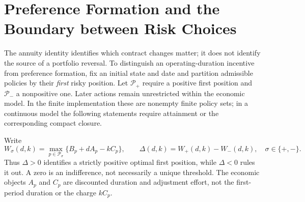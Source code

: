 \section{Preference Formation and the Boundary between Risk Choices}
\label{sec:risk_frontier}
The annuity identity identifies which contract changes matter; it does not identify the source of a portfolio reversal. To distinguish an operating-duration incentive from preference formation, fix an initial state and date and partition admissible policies by their \emph{first} risky position. Let $\mathcal P_+$ require a positive first position and $\mathcal P_-$ a nonpositive one. Later actions remain unrestricted within the economic model. In the finite implementation these are nonempty finite policy sets; in a continuous model the following statements require attainment or the corresponding compact closure.

Write
\begin{equation}
 W_\sigma(d,k)=\max_{p\in\mathcal P_\sigma}\{B_p+dA_p-kC_p\},\qquad
 \Delta(d,k)=W_+(d,k)-W_-(d,k),\quad \sigma\in\{+,-\}.
 \label{eq:risk_class_values}
\end{equation}
Thus $\Delta>0$ identifies a strictly positive optimal first position, while $\Delta<0$ rules it out. A zero is an indifference, not necessarily a unique threshold. The economic objects $A_p$ and $C_p$ are discounted duration and adjustment effort, not the first-period duration or the charge $kC_p$.

